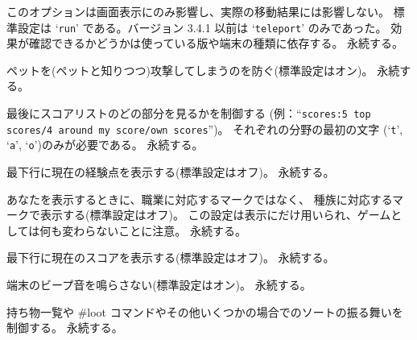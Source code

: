 このオプションは画面表示にのみ影響し、実際の移動結果には影響しない。
標準設定は `{\tt run}' である。バージョン 3.4.1 以前は `{\tt teleport}' のみであった。
効果が確認できるかどうかは使っている版や端末の種類に依存する。
永続する。
\item[\ib{safe\verb+_+pet}]
ペットを(ペットと知りつつ)攻撃してしまうのを防ぐ(標準設定はオン)。
永続する。
\item[\ib{scores}]
最後にスコアリストのどの部分を見るかを制御する
(例：``{\tt scores:5 top scores/4 around my score/own scores}'')。
それぞれの分野の最初の文字 (`{\tt t}', `{\tt a}', `{\tt o}')のみが必要である。
永続する。
\item[\ib{showexp}]
最下行に現在の経験点を表示する(標準設定はオフ)。
永続する。
\item[\ib{showrace}]
あなたを表示するときに、職業に対応するマークではなく、
種族に対応するマークで表示する(標準設定はオフ)。
この設定は表示にだけ用いられ、ゲームとしては何も変わらないことに注意。
永続する。
\item[\ib{showscore}]
最下行に現在のスコアを表示する(標準設定はオフ)。
永続する。
\item[\ib{silent}]
端末のビープ音を鳴らさない(標準設定はオン)。
永続する。
\item[\ib{sortloot}]
持ち物一覧や \#loot コマンドやその他いくつかの場合でのソートの振る舞いを
制御する。
永続する。

